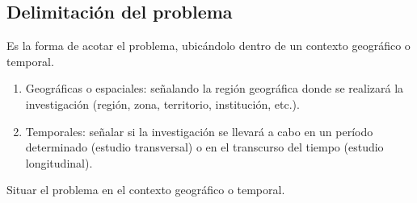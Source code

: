 \subsection{Delimitación del problema}

Es la forma de acotar el problema, ubicándolo dentro de un contexto geográfico o temporal.

\begin{enumerate}[noitemsep]
 \item Geográficas o espaciales: señalando la región geográfica donde se realizará la investigación (región, zona, territorio, institución, etc.).
 \item Temporales: señalar si la investigación se llevará a cabo en un período determinado (estudio transversal) o en el transcurso del tiempo (estudio longitudinal).
\end{enumerate}

Situar el problema en el contexto geográfico o temporal.

